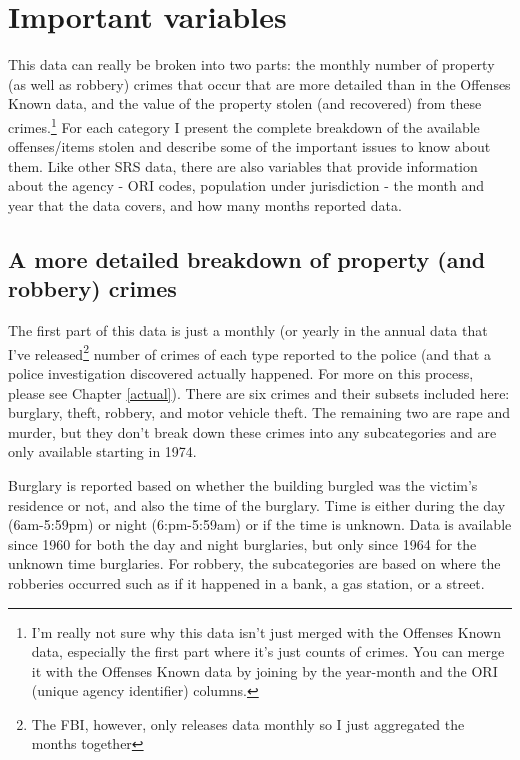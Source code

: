 \documentclass[
]{krantz}
\begin{document}
\section{Important variables}\label{important-variables-1}

This data can really be broken into two parts: the monthly
number of property (as well as robbery) crimes that occur
that are more detailed than in the Offenses Known data, and
the value of the property stolen (and recovered) from these
crimes.\footnote{I'm really not sure why this data isn't
  just merged with the Offenses Known data, especially the
  first part where it's just counts of crimes. You can merge
  it with the Offenses Known data by joining by the
  year-month and the ORI (unique agency identifier) columns.}
For each category I present the complete breakdown of the
available offenses/items stolen and describe some of the
important issues to know about them. Like other SRS data,
there are also variables that provide information about the
agency - ORI codes, population under jurisdiction - the
month and year that the data covers, and how many months
reported data.

\subsection{A more detailed breakdown of property (and
robbery) crimes}\label{propertycount}

The first part of this data is just a monthly (or yearly in
the annual data that I've released\footnote{The FBI,
  however, only releases data monthly so I just aggregated
  the months together} number of crimes of each type
reported to the police (and that a police investigation
discovered actually happened. For more on this process,
please see Chapter \ref{actual}). There are six crimes and
their subsets included here: burglary, theft, robbery, and
motor vehicle theft. The remaining two are rape and murder,
but they don't break down these crimes into any
subcategories and are only available starting in 1974.

Burglary is reported based on whether the building burgled
was the victim's residence or not, and also the time of the
burglary. Time is either during the day (6am-5:59pm) or
night (6:pm-5:59am) or if the time is unknown. Data is
available since 1960 for both the day and night burglaries,
but only since 1964 for the unknown time burglaries. For
robbery, the subcategories are based on where the robberies
occurred such as if it happened in a bank, a gas station, or
a street.
\end{document}
